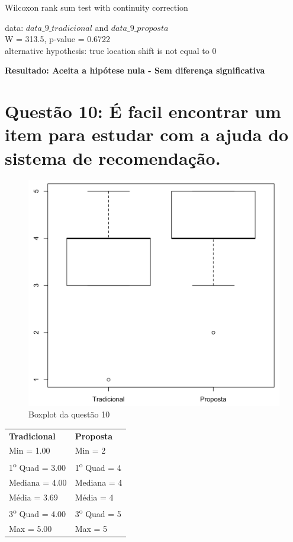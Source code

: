 Wilcoxon rank sum test with continuity correction

\noindent
data:  $data\_9\_tradicional$ and $data\_9\_proposta$\\
W = 313.5, p-value = 0.6722\\
alternative hypothesis: true location shift is not equal to 0

\noindent
\textbf{Resultado: Aceita a hipótese nula - Sem diferença significativa}

\newpage
\section{Questão 10: É facil encontrar um item para estudar com a ajuda do sistema de recomendação.}

\begin{figure}[htb]
  \caption{\label{fig:questao10-boxplot}Boxplot da questão 10}
  \begin{center}
      \includegraphics[scale=0.4]{./Figuras/questao10-boxplot.png}
  \end{center}
\end{figure}

\begin{table}[h]
\begin{tabular}{p{}p{}}
\textbf{Tradicional} & \textbf{Proposta} \\
Min = 1.00 & Min = 2\\
1\textsuperscript{o} Quad = 3.00 & 1\textsuperscript{o} Quad = 4\\
Mediana = 4.00 & Mediana = 4\\
Média = 3.69 & Média = 4\\
3\textsuperscript{o} Quad = 4.00 & 3\textsuperscript{o} Quad = 5\\
Max = 5.00 & Max = 5\\
\end{tabular}
\end{table}

